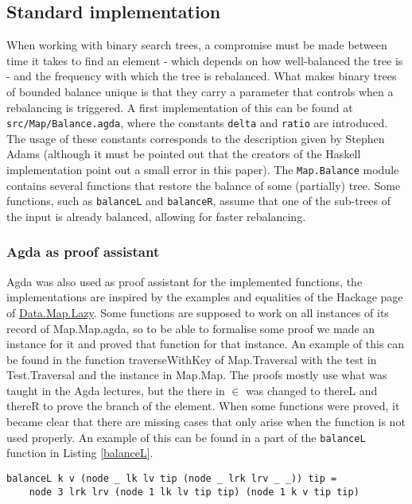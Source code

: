 \documentclass[a4paper,UKenglish,cleveref, autoref, thm-restate]{template/lipics-v2021}
\begin{document}
\subsection{Standard implementation}\label{vulnerabilities}
When working with binary search trees, a compromise must be made between time it takes to find an element - which depends on how well-balanced the tree is - and the frequency with which the tree is rebalanced. What makes binary trees of bounded balance unique is that they carry a parameter that controls when a rebalancing is triggered. A first implementation of this can be found at \texttt{src/Map/Balance.agda}, where the constants \texttt{delta} and \texttt{ratio} are introduced. The usage of these constants corresponds to the description given by Stephen Adams \cite{adams1993functional} (although it must be pointed out that the creators of the Haskell implementation point out a small error in this paper). The \texttt{Map.Balance} module contains several functions that restore the balance of some (partially) tree. Some functions, such as \texttt{balanceL} and \texttt{balanceR}, assume that one of the sub-trees of the input is already balanced, allowing for faster rebalancing.


\subsubsection{Agda as proof assistant}
Agda was also used as proof assistant for the implemented functions, the implementations are inspired by the examples and equalities of the Hackage page of \href{https://hackage.haskell.org/package/containers-0.8/docs/Data-Map-Lazy.html}{Data.Map.Lazy}. 
Some functions are supposed to work on all instances of its record of Map.Map.agda, so to be able to formalise some proof we made an instance for it and proved that function for that instance. An example of this can be found in the function traverseWithKey of Map.Traversal with the test in Test.Traversal and the instance in Map.Map.
The proofs mostly use what was taught in the Agda lectures, but the there in $\in$ was changed to thereL and thereR to prove the branch of the element.
When some functions were proved, it became clear that there are missing cases that only arise when the function is not used properly. An example of this can be found in a part of the \texttt{balanceL} function in Listing \ref{balanceL}.

\begin{lstlisting}[label=balanceL,caption=balanceL assumes that the size of a node is 3 when the right branch is a tip.]
balanceL k v (node _ lk lv tip (node _ lrk lrv _ _)) tip = 
    node 3 lrk lrv (node 1 lk lv tip tip) (node 1 k v tip tip)
\end{lstlisting}
\end{document}
